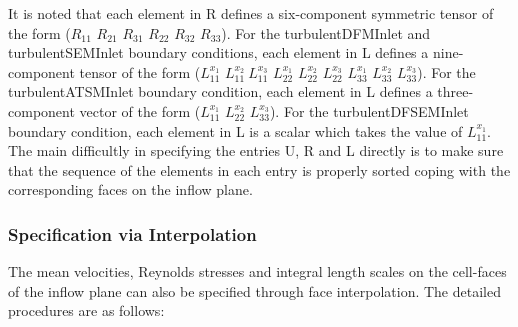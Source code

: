 \noindent It is noted that each element in \textcolor{mauve}{R} defines a six-component symmetric tensor of the form ($R_{11}$ $R_{21}$ $R_{31}$ $R_{22}$ $R_{32}$ $R_{33}$). For the \textcolor{mauve}{turbulentDFMInlet} and \textcolor{mauve}{turbulentSEMInlet} boundary conditions, each element in \textcolor{mauve}{L} defines a nine-component tensor of the form ($L_{11}^{x_1}$ $L_{11}^{x_2} \ L_{11}^{x_3}$ $L_{22}^{x_1}$ $L_{22}^{x_2}$ $L_{22}^{x_3}$ $L_{33}^{x_1}$ $L_{33}^{x_2}$ $L_{33}^{x_3}$). For the \textcolor{mauve}{turbulentATSMInlet} boundary condition, each element in \textcolor{mauve}{L} defines a three-component vector of the form ($L_{11}^{x_1}$ $L_{22}^{x_2}$ $L_{33}^{x_3}$).  For the \textcolor{mauve}{turbulentDFSEMInlet} boundary condition, each element in \textcolor{mauve}{L} is a scalar which takes the value of $L_{11}^{x_1}$. The main difficultly in specifying the entries \textcolor{mauve}{U}, \textcolor{mauve}{R} and \textcolor{mauve}{L} directly is to make sure that the sequence of the elements in each entry is properly sorted coping with the corresponding faces on the inflow plane.

\subsubsection{Specification via Interpolation}

The mean velocities, Reynolds stresses and integral length scales on the cell-faces of the inflow plane can also be specified through face interpolation. The detailed procedures are as follows:

